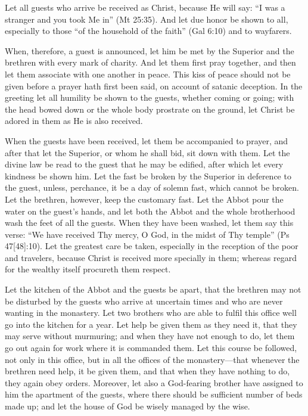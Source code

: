 
Let all guests who arrive be received as Christ, because He will say: ``I was a stranger and you took Me in'' (Mt 25:35). And let due honor be shown to all, especially to those ``of the household of the faith'' (Gal 6:10) and to wayfarers.

When, therefore, a guest is announced, let him be met by the Superior and the brethren with every mark of charity. And let them first pray together, and then let them associate with one another in peace. This kiss of peace should not be given before a prayer hath first been said, on account of satanic deception. In the greeting let all humility be shown to the guests, whether coming or going; with the head bowed down or the whole body prostrate on the ground, let Christ be adored in them as He is also received.

When the guests have been received, let them be accompanied to prayer, and after that let the Superior, or whom he shall bid, sit down with them. Let the divine law be read to the guest that he may be edified, after which let every kindness be shown him. Let the fast be broken by the Superior in deference to the guest, unless, perchance, it be a day of solemn fast, which cannot be broken. Let the brethren, however, keep the customary fast. Let the Abbot pour the water on the guest's hands, and let both the Abbot and the whole brotherhood wash the feet of all the guests. When they have been washed, let them say this verse: ``We have received Thy mercy, O God, in the midst of Thy temple'' (Ps 47[48]:10). Let the greatest care be taken, especially in the reception of the poor and travelers, because Christ is received more specially in them; whereas regard for the wealthy itself procureth them respect.

Let the kitchen of the Abbot and the guests be apart, that the brethren may not be disturbed by the guests who arrive at uncertain times and who are never wanting in the monastery. Let two brothers who are able to fulfil this office well go into the kitchen for a year. Let help be given them as they need it, that they may serve without murmuring; and when they have not enough to do, let them go out again for work where it is commanded them. Let this course be followed, not only in this office, but in all the offices of the monastery—that whenever the brethren need help, it be given them, and that when they have nothing to do, they again obey orders. Moreover, let also a God-fearing brother have assigned to him the apartment of the guests, where there should be sufficient number of beds made up; and let the house of God be wisely managed by the wise.

